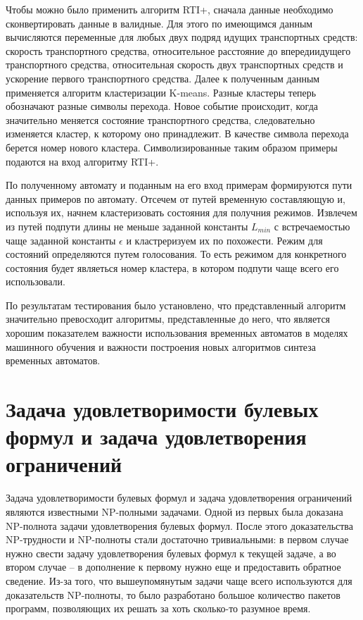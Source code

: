 \documentclass[times,specification,annotation]{itmo-student-thesis}
\begin{document}
Чтобы можно было применить алгоритм RTI+, сначала данные необходимо сконвертировать данные в валидные. Для этого по имеющимся данным вычисляются переменные для любых
двух подряд идущих транспортных средств: скорость транспортного средства, относительное расстояние до впередиидущего транспортного средства, относительная скорость двух транспортных
средств и ускорение первого транспортного средства. Далее к полученным данным применяется алгоритм кластеризации K-means. Разные кластеры теперь обозначают разные символы перехода.
Новое событие происходит, когда значительно меняется состояние транспортного средства, следовательно изменяется кластер, к которому оно принадлежит. В качестве символа перехода берется номер
нового кластера. Символизированные таким образом примеры подаются на вход алгоритму RTI+.

По полученному автомату и поданным на его вход примерам формируются пути данных примеров по автомату. Отсечем от путей временную составляющую и, используя их, начнем кластеризовать состояния
для получния режимов. Извлечем из путей подпути длины не меньше заданной константы $L_{min}$ с встречаемостью чаще заданной константы $\epsilon$ и кластреризуем их по похожести. Режим для
состояний определяются путем голосования. То есть режимом для конкретного состояния будет являеться номер кластера, в котором подпути чаще всего его использовали.

По результатам тестирования было установлено, что представленный алгоритм значительно превосходит алгоритмы, представленные до него, что является хорошим показателем важности
использования временных автоматов в моделях машинного обучения и важности построения новых алгоритмов синтеза временных автоматов.

\section{Задача удовлетворимости булевых формул и задача удовлетворения ограничений}

Задача удовлетворимости булевых формул и задача удовлетворения ограничений являются известными NP-полными задачами. Одной из первых была доказана NP-полнота задачи удовлетворения
булевых формул. После этого доказательства NP-трудности и NP-полноты стали достаточно тривиальными: в первом случае нужно свести задачу удовлетворения булевых формул
к текущей задаче, а во втором случае -- в дополнение к первому нужно еще и предоставить обратное сведение. Из-за того, что вышеупомянутым задачи чаще всего используются для
доказательств NP-полноты, то было разработано большое количество пакетов программ, позволяющих их решать за хоть сколько-то разумное время. 
\end{document}
